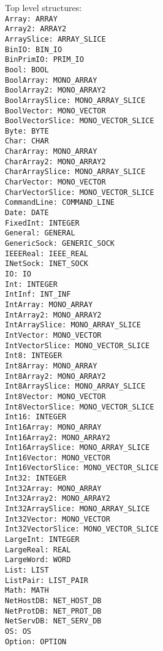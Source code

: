 \newcommand{\fullmodule}[2]{{\tt #1: #2}\\ }
Top level structures:\\
\fullmodule{Array}{ARRAY}
\fullmodule{Array2}{ARRAY2}
\fullmodule{ArraySlice}{ARRAY\_SLICE}
\fullmodule{BinIO}{BIN\_IO}
\fullmodule{BinPrimIO}{PRIM\_IO}
\fullmodule{Bool}{BOOL}
\fullmodule{BoolArray}{MONO\_ARRAY}
\fullmodule{BoolArray2}{MONO\_ARRAY2}
\fullmodule{BoolArraySlice}{MONO\_ARRAY\_SLICE}
\fullmodule{BoolVector}{MONO\_VECTOR}
\fullmodule{BoolVectorSlice}{MONO\_VECTOR\_SLICE}
\fullmodule{Byte}{BYTE}
\fullmodule{Char}{CHAR}
\fullmodule{CharArray}{MONO\_ARRAY}
\fullmodule{CharArray2}{MONO\_ARRAY2}
\fullmodule{CharArraySlice}{MONO\_ARRAY\_SLICE}
\fullmodule{CharVector}{MONO\_VECTOR}
\fullmodule{CharVectorSlice}{MONO\_VECTOR\_SLICE}
\fullmodule{CommandLine}{COMMAND\_LINE}
\fullmodule{Date}{DATE}
\fullmodule{FixedInt}{INTEGER}
\fullmodule{General}{GENERAL}
\fullmodule{GenericSock}{GENERIC\_SOCK}
\fullmodule{IEEEReal}{IEEE\_REAL}
\fullmodule{INetSock}{INET\_SOCK}
\fullmodule{IO}{IO}
\fullmodule{Int}{INTEGER}
\fullmodule{IntInf}{INT\_INF}
\fullmodule{IntArray}{MONO\_ARRAY}
\fullmodule{IntArray2}{MONO\_ARRAY2}
\fullmodule{IntArraySlice}{MONO\_ARRAY\_SLICE}
\fullmodule{IntVector}{MONO\_VECTOR}
\fullmodule{IntVectorSlice}{MONO\_VECTOR\_SLICE}
\fullmodule{Int8}{INTEGER}
\fullmodule{Int8Array}{MONO\_ARRAY}
\fullmodule{Int8Array2}{MONO\_ARRAY2}
\fullmodule{Int8ArraySlice}{MONO\_ARRAY\_SLICE}
\fullmodule{Int8Vector}{MONO\_VECTOR}
\fullmodule{Int8VectorSlice}{MONO\_VECTOR\_SLICE}
\fullmodule{Int16}{INTEGER}
\fullmodule{Int16Array}{MONO\_ARRAY}
\fullmodule{Int16Array2}{MONO\_ARRAY2}
\fullmodule{Int16ArraySlice}{MONO\_ARRAY\_SLICE}
\fullmodule{Int16Vector}{MONO\_VECTOR}
\fullmodule{Int16VectorSlice}{MONO\_VECTOR\_SLICE}
\fullmodule{Int32}{INTEGER}
\fullmodule{Int32Array}{MONO\_ARRAY}
\fullmodule{Int32Array2}{MONO\_ARRAY2}
\fullmodule{Int32ArraySlice}{MONO\_ARRAY\_SLICE}
\fullmodule{Int32Vector}{MONO\_VECTOR}
\fullmodule{Int32VectorSlice}{MONO\_VECTOR\_SLICE}
\fullmodule{LargeInt}{INTEGER}
\fullmodule{LargeReal}{REAL}
\fullmodule{LargeWord}{WORD}
\fullmodule{List}{LIST}
\fullmodule{ListPair}{LIST\_PAIR}
\fullmodule{Math}{MATH}
\fullmodule{NetHostDB}{NET\_HOST\_DB}
\fullmodule{NetProtDB}{NET\_PROT\_DB}
\fullmodule{NetServDB}{NET\_SERV\_DB}
\fullmodule{OS}{OS}
\fullmodule{Option}{OPTION}
